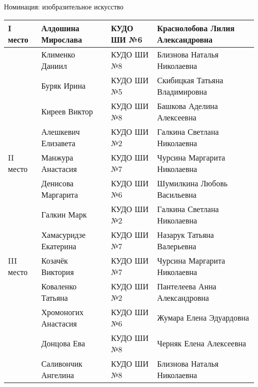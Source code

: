  
 
 
 
 

Номинация: изобразительное искусство

\begin{longtable}{|l|l|l|l}
\hline I место     & Алдошина Мирослава    & КУДО ШИ №6         & Краснолобова Лилия Александровна \\
\hline             & Клименко Даниил       & КУДО ШИ №8         & Близнова Наталья Николаевна      \\
\hline             & Буряк Ирина           & КУДО ШИ №5         & Скибицкая Татьяна Владимировна   \\
\hline             & Киреев Виктор         & КУДО ШИ №8         & Башкова Аделина Алексеевна       \\
\hline             & Алешкевич Елизавета   & КУДО ШИ №2         & Галкина Светлана Николаевна      \\
\hline II место    & Манжура Анастасия     & КУДО ШИ №7         & Чурсина Маргарита Николаевна     \\
\hline             & Денисова Маргарита    & КУДО ШИ №6         & Шумилкина Любовь Васильевна      \\
\hline             & Галкин Марк           & КУДО ШИ №2         & Галкина Светлана Николаевна      \\
\hline             & Хамасуридзе Екатерина & КУДО ШИ №7         & Назарук Татьяна Валерьевна       \\
\hline III место   & Козачёк Виктория      & КУДО ШИ №7         & Чурсина Маргарита Николаевна     \\
\hline             & Коваленко Татьяна     & КУДО ШИ №2         & Пантелеева Анна Александровна    \\
\hline             & Хромоногих Анастасия  & КУДО ШИ №6         & Жумара Елена Эдуардовна          \\
\hline             & Донцова Ева           & КУДО ШИ №8         & Черняк Елена Алексеевна          \\
\hline             & Саливончик Ангелина   & КУДО ШИ №8         & Близнова Наталья Николаевна      \\

\end{longtable}
